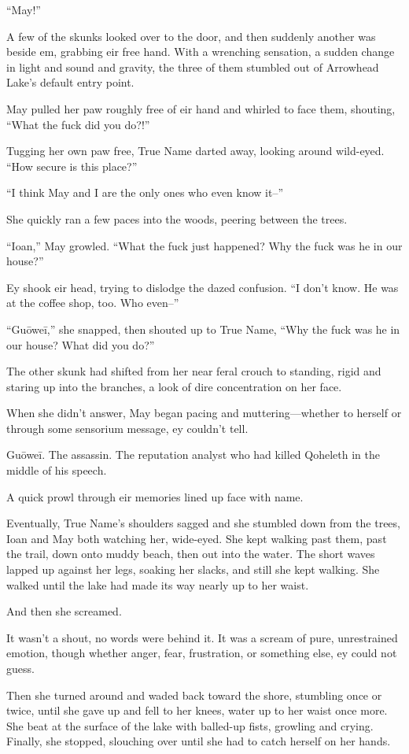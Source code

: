 ``May!''

A few of the skunks looked over to the door, and then suddenly another was beside em, grabbing eir free hand. With a wrenching sensation, a sudden change in light and sound and gravity, the three of them stumbled out of Arrowhead Lake's default entry point.

May pulled her paw roughly free of eir hand and whirled to face them, shouting, ``What the fuck did you do?!''

Tugging her own paw free, True Name darted away, looking around wild-eyed. ``How secure is this place?''

``I think May and I are the only ones who even know it--''

She quickly ran a few paces into the woods, peering between the trees.

``Ioan,'' May growled. ``What the fuck just happened? Why the fuck was he in our house?''

Ey shook eir head, trying to dislodge the dazed confusion. ``I don't know. He was at the coffee shop, too. Who even--''

``Guōweī,'' she snapped, then shouted up to True Name, ``Why the fuck was he in our house? What did you do?''

The other skunk had shifted from her near feral crouch to standing, rigid and staring up into the branches, a look of dire concentration on her face.

When she didn't answer, May began pacing and muttering—whether to herself or through some sensorium message, ey couldn't tell.

Guōweī. The assassin. The reputation analyst who had killed Qoheleth in the middle of his speech.

A quick prowl through eir memories lined up face with name.

Eventually, True Name's shoulders sagged and she stumbled down from the trees, Ioan and May both watching her, wide-eyed. She kept walking past them, past the trail, down onto muddy beach, then out into the water. The short waves lapped up against her legs, soaking her slacks, and still she kept walking. She walked until the lake had made its way nearly up to her waist.

And then she screamed.

It wasn't a shout, no words were behind it. It was a scream of pure, unrestrained emotion, though whether anger, fear, frustration, or something else, ey could not guess.

Then she turned around and waded back toward the shore, stumbling once or twice, until she gave up and fell to her knees, water up to her waist once more. She beat at the surface of the lake with balled-up fists, growling and crying. Finally, she stopped, slouching over until she had to catch herself on her hands.


